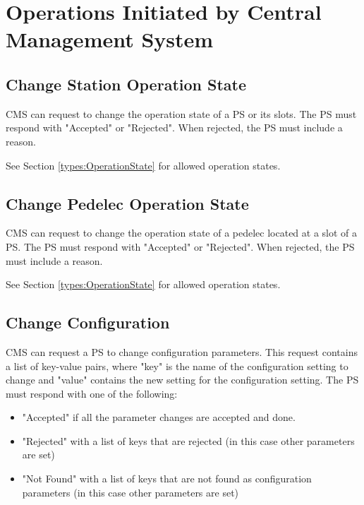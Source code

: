 \section{Operations Initiated by Central Management System}

\subsection{Change Station Operation State}

\acs{CMS} can request to change the operation state of a \acs{PS} or its slots. The \acs{PS} must respond with "Accepted" or "Rejected". When rejected, the \acs{PS} must include a reason.

 See Section \ref{types:OperationState} for allowed operation states.

\subsection{Change Pedelec Operation State}

\acs{CMS} can request to change the operation state of a pedelec located at a slot of a \acs{PS}. The \acs{PS} must respond with "Accepted" or "Rejected". When rejected, the \acs{PS} must include a reason.

 See Section \ref{types:OperationState} for allowed operation states.

\subsection{Change Configuration}

\acs{CMS} can request a \acs{PS} to change configuration parameters. This request contains a list of key-value pairs, where "key" is the name of the configuration setting to change and "value" contains the new setting for the configuration setting. The \acs{PS} must respond with one of the following:
\begin{itemize}
	\item "Accepted" if all the parameter changes are accepted and done.
	\item "Rejected" with a list of keys that are rejected (in this case other parameters are set)
	\item "Not Found" with a list of keys that are not found as configuration parameters (in this case other parameters are set)
\end{itemize}

